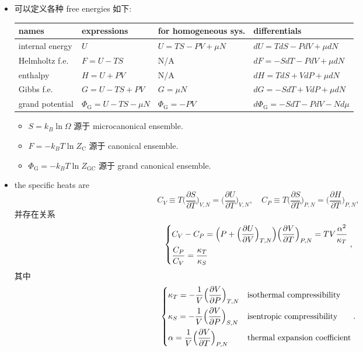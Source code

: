 \begin{itemize}
	\item 可以定义各种 free energies 如下:
	
	\begin{center}
		\begin{tabularx}{\linewidth}{XXXl}
			\toprule 
			names & expressions & for homogeneous sys. & differentials \\
			\midrule 
			internal energy & $U$ & $U = T S - P V + \mu N$ & $dU = T dS - P dV + \mu dN$ \\
			Helmholtz f.e. & $F = U - T S$ & N/A & $dF = - S dT - P dV + \mu dN$ \\
			enthalpy & $H = U + P V$ & N/A & $dH = T dS + V dP + \mu dN$ \\
			Gibbs f.e. & $G = U - T S + P V$ & $G = \mu N$ & $dG = - S dT + V dP + \mu dN$ \\
			grand potential & $\Phi_\text{G} = U - T S - \mu N$ & $\Phi_\text{G} = - P V$ & $d\Phi_\text{G} = - S dT - P dV - N d\mu$ \\
			\bottomrule
		\end{tabularx}
	\end{center}
	
	\begin{itemize}
		\item $S = k_B \ln \Omega$ 源于 microcanonical ensemble.
		\item $F = - k_B T \ln Z_\text{C}$ 源于 canonical ensemble.
		\item $\Phi_\text{G} = - k_B T \ln Z_\text{GC}$ 源于 grand canonical ensemble.
	\end{itemize}
	
	\item the specific heats are
	\begin{equation}
		C_V \equiv T \Big( \frac{\partial S}{\partial T} \Big)_{V, N} = \Big( \frac{\partial U}{\partial T} \Big)_{V, N}, \quad C_P \equiv T \Big( \frac{\partial S}{\partial T} \Big)_{P, N} = \Big( \frac{\partial H}{\partial T} \Big)_{P, N},
	\end{equation}
	并存在关系
	\begin{equation}
		\begin{dcases}
			C_V - C_P = \Big( P + \Big( \frac{\partial U}{\partial V} \Big)_{T, N} \Big) \Big( \frac{\partial V}{\partial T} \Big)_{P, N}  = T V \frac{\alpha^2}{\kappa_T} \\
			\frac{C_P}{C_V} = \frac{\kappa_T}{\kappa_S}
		\end{dcases},
	\end{equation}
	其中
	\begin{equation}
		\begin{dcases}
			\kappa_T = - \frac{1}{V} \Big( \frac{\partial V}{\partial P} \Big)_{T, N} & \text{isothermal compressibility} \\
			\kappa_S = - \frac{1}{V} \Big( \frac{\partial V}{\partial P} \Big)_{S, N} & \text{isentropic compressibility} \\
			\alpha = \frac{1}{V} \Big( \frac{\partial V}{\partial T} \Big)_{P, N} & \text{thermal expansion coefficient}
		\end{dcases}.
	\end{equation}
\end{itemize}

